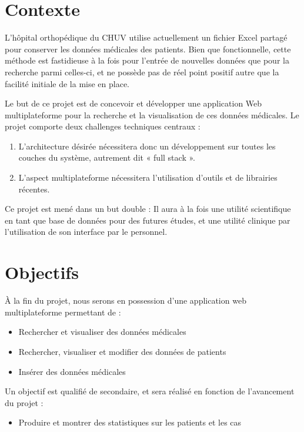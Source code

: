\section{Contexte}

	L'hôpital orthopédique du \gls{CHUV} utilise actuellement un fichier Excel partagé pour conserver les données médicales des patients. Bien que fonctionnelle, cette méthode est fastidieuse à la fois pour l'entrée de nouvelles données que pour la recherche parmi celles-ci, et ne possède pas de réel point positif autre que la facilité initiale de la mise en place.

	Le but de ce projet est de concevoir et développer une application Web multiplateforme pour la recherche et la visualisation de ces données médicales. Le projet comporte deux challenges techniques centraux :
	\begin{enumerate}
		\item L’architecture désirée nécessitera donc un développement sur toutes les couches du système, autrement dit « full stack ».
		\item L’aspect multiplateforme nécessitera l’utilisation d’outils et de librairies récentes.
	\end{enumerate}
	Ce projet est mené dans un but double : Il aura à la fois une utilité scientifique en tant que base de données pour des futures études, et une utilité clinique par l’utilisation de son interface par le personnel.

\section{Objectifs}

	À la fin du projet, nous serons en possession d’une application web multiplateforme permettant de :
	\begin{itemize}
		\item Rechercher et visualiser des données médicales
		\item Rechercher, visualiser et modifier des données de patients
		\item Insérer des données médicales
	\end{itemize}

	Un objectif est qualifié de secondaire, et sera réalisé en fonction de l’avancement du projet :
	\begin{itemize}
		\item Produire et montrer des statistiques sur les patients et les cas
	\end{itemize}

